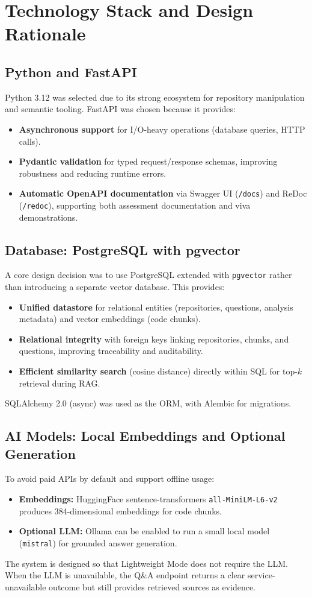 \documentclass[11pt,a4paper]{article}
\begin{document}
\section{Technology Stack and Design Rationale}

\subsection{Python and FastAPI}
Python 3.12 was selected due to its strong ecosystem for repository manipulation and semantic tooling. FastAPI was chosen because it provides:
\begin{itemize}[leftmargin=1.2em]
  \item \textbf{Asynchronous support} for I/O-heavy operations (database queries, HTTP calls).
  \item \textbf{Pydantic validation} for typed request/response schemas, improving robustness and reducing runtime errors.
  \item \textbf{Automatic OpenAPI documentation} via Swagger UI (\texttt{/docs}) and ReDoc (\texttt{/redoc}), supporting both assessment documentation and viva demonstrations.
\end{itemize}

\subsection{Database: PostgreSQL with pgvector}
A core design decision was to use PostgreSQL extended with \texttt{pgvector} rather than introducing a separate vector database. This provides:
\begin{itemize}[leftmargin=1.2em]
  \item \textbf{Unified datastore} for relational entities (repositories, questions, analysis metadata) and vector embeddings (code chunks).
  \item \textbf{Relational integrity} with foreign keys linking repositories, chunks, and questions, improving traceability and auditability.
  \item \textbf{Efficient similarity search} (cosine distance) directly within SQL for top-$k$ retrieval during RAG.
\end{itemize}
SQLAlchemy 2.0 (async) was used as the ORM, with Alembic for migrations.

\subsection{AI Models: Local Embeddings and Optional Generation}
To avoid paid APIs by default and support offline usage:
\begin{itemize}[leftmargin=1.2em]
  \item \textbf{Embeddings:} HuggingFace sentence-transformers \texttt{all-MiniLM-L6-v2} produces 384-dimensional embeddings for code chunks.
  \item \textbf{Optional LLM:} Ollama can be enabled to run a small local model (\texttt{mistral}) for grounded answer generation.
\end{itemize}
The system is designed so that Lightweight Mode does not require the LLM. When the LLM is unavailable, the Q\&A endpoint returns a clear service-unavailable outcome but still provides retrieved sources as evidence.
\end{document}
